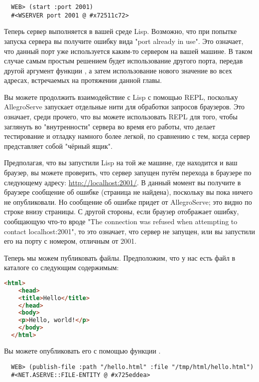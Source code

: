 \begin{lstlisting}
  WEB> (start :port 2001)
  #<WSERVER port 2001 @ #x72511c72>
\end{lstlisting}

Теперь сервер выполняется в вашей среде Lisp. Возможно, что при попытке запуска сервера вы
получите ошибку вида "port already in use". Это означает, что данный порт уже используется
каким-то сервером на вашей машине. В таком случае самым простым решением будет
использование другого порта, передав другой аргумент функции , а затем
использование нового значение во всех адресах, встречаемых на протяжении данной главы.

Вы можете продолжить взаимодействие с Lisp с помощью REPL, поскольку AllegroServe
запускает отдельные нити для обработки запросов браузеров. Это означает, среди прочего,
что вы можете использовать REPL для того, чтобы заглянуть во "внутренности" сервера во
время его работы, что делает тестирование и отладку намного более легкой, по сравнению с
тем, когда сервер представляет собой "чёрный ящик".

Предполагая, что вы запустили Lisp на той же машине, где находится и ваш браузер, вы
можете проверить, что сервер запущен путём перехода в браузере по следующему адресу:
\url{http://localhost:2001/}. В данный момент вы получите в браузере сообщение об ошибке
 (страница не найдена), поскольку вы пока ничего не опубликовали. Но
сообщение об ошибке придет от AllegroServe; это видно по строке внизу страницы. С другой
стороны, если браузер отображает ошибку, сообщающую что-то вроде "The connection was
refused when attempting to contact localhost:2001", то это означает, что сервер не
запущен, или вы запустили его на порту с номером, отличным от 2001.

Теперь мы можем публиковать файлы. Предположим, что у нас есть файл  в
каталоге  со следующим содержимым:

\begin{lstlisting}[language=HTML]
  <html>
    <head>
    <title>Hello</title>
    </head>
    <body>
    <p>Hello, world!</p>
    </body>
  </html>
\end{lstlisting}

Вы можете опубликовать его с помощью функции .

\begin{lstlisting}
  WEB> (publish-file :path "/hello.html" :file "/tmp/html/hello.html")
  #<NET.ASERVE::FILE-ENTITY @ #x725eddea>
\end{lstlisting}

